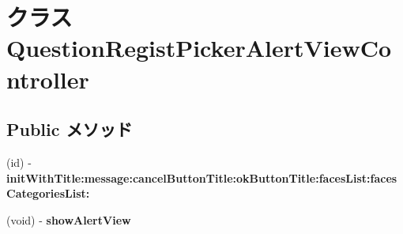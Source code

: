 \hypertarget{interface_question_regist_picker_alert_view_controller}{
\section{クラス QuestionRegistPickerAlertViewController}
\label{interface_question_regist_picker_alert_view_controller}
}
\subsection*{Public メソッド}
\begin{DoxyCompactItemize}
\item 
\hypertarget{interface_question_regist_picker_alert_view_controller_a003a9b00d552e4c544770ab7418fc280}{
(id) -\/ {\bfseries initWithTitle:message:cancelButtonTitle:okButtonTitle:facesList:facesCategoriesList:}}
\label{interface_question_regist_picker_alert_view_controller_a003a9b00d552e4c544770ab7418fc280}

\item 
\hypertarget{interface_question_regist_picker_alert_view_controller_a5f345ef74578eb28348f1e4cd1a8ba8e}{
(void) -\/ {\bfseries showAlertView}}
\label{interface_question_regist_picker_alert_view_controller_a5f345ef74578eb28348f1e4cd1a8ba8e}

\end{DoxyCompactItemize}
